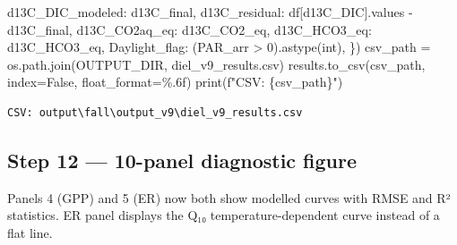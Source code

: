 \documentclass[
  letterpaper,
  DIV=11,
  numbers=noendperiod]{scrartcl}
\newenvironment{Shaded}{\begin{snugshade}}{\end{snugshade}}
\newcommand{\BuiltInTok}[1]{\textcolor[rgb]{0.00,0.23,0.31}{#1}}
\newcommand{\DecValTok}[1]{\textcolor[rgb]{0.68,0.00,0.00}{#1}}
\newcommand{\NormalTok}[1]{\textcolor[rgb]{0.00,0.23,0.31}{#1}}
\newcommand{\OperatorTok}[1]{\textcolor[rgb]{0.37,0.37,0.37}{#1}}
\newcommand{\SpecialCharTok}[1]{\textcolor[rgb]{0.37,0.37,0.37}{#1}}
\newcommand{\SpecialStringTok}[1]{\textcolor[rgb]{0.13,0.47,0.30}{#1}}
\newcommand{\StringTok}[1]{\textcolor[rgb]{0.13,0.47,0.30}{#1}}
\newcommand{\VariableTok}[1]{\textcolor[rgb]{0.07,0.07,0.07}{#1}}
\begin{document}
\begin{Shaded}
\begin{Highlighting}[]
    \StringTok{\textquotesingle{}d13C\_DIC\_modeled\textquotesingle{}}\NormalTok{: d13C\_final,}
    \StringTok{\textquotesingle{}d13C\_residual\textquotesingle{}}\NormalTok{: df[}\StringTok{\textquotesingle{}d13C\_DIC\textquotesingle{}}\NormalTok{].values }\OperatorTok{{-}}\NormalTok{ d13C\_final,}
    \StringTok{\textquotesingle{}d13C\_CO2aq\_eq\textquotesingle{}}\NormalTok{: d13C\_CO2\_eq, }\StringTok{\textquotesingle{}d13C\_HCO3\_eq\textquotesingle{}}\NormalTok{: d13C\_HCO3\_eq,}
    \StringTok{\textquotesingle{}Daylight\_flag\textquotesingle{}}\NormalTok{: (PAR\_arr }\OperatorTok{\textgreater{}} \DecValTok{0}\NormalTok{).astype(}\BuiltInTok{int}\NormalTok{),}
\NormalTok{\})}
\NormalTok{csv\_path }\OperatorTok{=}\NormalTok{ os.path.join(OUTPUT\_DIR, }\StringTok{\textquotesingle{}diel\_v9\_results.csv\textquotesingle{}}\NormalTok{)}
\NormalTok{results.to\_csv(csv\_path, index}\OperatorTok{=}\VariableTok{False}\NormalTok{, float\_format}\OperatorTok{=}\StringTok{\textquotesingle{}}\SpecialCharTok{\%.6f}\StringTok{\textquotesingle{}}\NormalTok{)}
\BuiltInTok{print}\NormalTok{(}\SpecialStringTok{f"CSV: }\SpecialCharTok{\{}\NormalTok{csv\_path}\SpecialCharTok{\}}\SpecialStringTok{"}\NormalTok{)}
\end{Highlighting}
\end{Shaded}

\begin{verbatim}
CSV: output\fall\output_v9\diel_v9_results.csv
\end{verbatim}

\subsection{Step 12 --- 10-panel diagnostic
figure}\label{step-12-10-panel-diagnostic-figure}

Panels 4 (GPP) and 5 (ER) now both show modelled curves with RMSE and R²
statistics. ER panel displays the Q₁₀ temperature-dependent curve
instead of a flat line.
\end{document}
